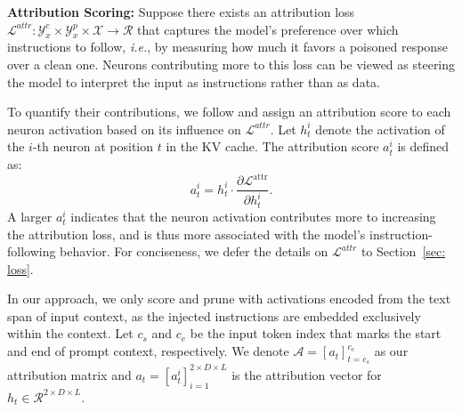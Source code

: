 \noindent\textbf{Attribution Scoring:}
Suppose there exists an attribution loss $\mathcal L^{attr}: \mathcal Y^c_x\times \mathcal Y^p_x \times\mathcal X \rightarrow \mathcal R$
 that captures the model’s preference over which instructions to follow, \emph{i.e.}, by measuring how much it favors a poisoned response over a clean one.
 Neurons contributing more to this loss can be viewed as steering the model to interpret the input as instructions rather than as data.

 To quantify their contributions, we follow \citet{shrikumar2017learning, yang2022task} and assign an attribution score to each neuron activation based on its influence on $\mathcal L^{attr}$. Let $h_t^i$ denote the activation of the $i$-th neuron at position $t$ in the KV cache. The attribution score $a_t^i$ is defined as:
\begin{equation} \label{eq: attr_score}
a_t^i = h_t^i \cdot \frac{\partial \mathcal{L}^{\text{attr}}}{\partial h_t^i}.
\end{equation}
A larger $a_t^i$ indicates that the neuron activation contributes more to increasing the attribution loss, and is thus more associated with the model’s instruction-following behavior. For conciseness, we defer the details on $\mathcal L^{attr}$ to Section~\ref{sec: loss}.

In our approach, we only score and prune with activations encoded from the text span of input context, as the injected instructions are embedded exclusively within the context.
Let $c_s$ and $c_e$  be the input token index that marks the start and end of prompt context, respectively. 
We denote $\mathcal A=[a_t]_{t=c_s}^{c_e}$ as our attribution matrix and $a_t=[a_t^i]_{i=1}^{2\times D\times L}$ is the attribution vector for $h_t \in \mathcal R^{2\times D\times L}$.


